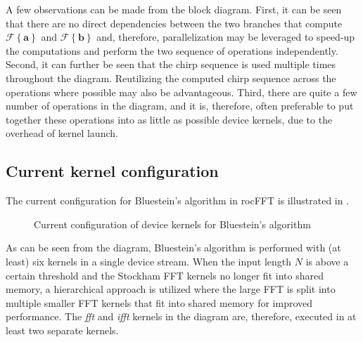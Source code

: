 \documentclass[11pt]{scrartcl}
\begin{document}
A few observations can be made from the block diagram.  First, it can be seen that there are no direct dependencies between the two branches that compute $\mathcal{F}\left\{ \mathbf{a} \right\}$ and $\mathcal{F}\left\{ \mathbf{b} \right\}$ and, therefore, parallelization may be leveraged to speed-up the computations and perform the two sequence of operations independently. Second, it can further be seen that the chirp sequence is used multiple times throughout the diagram. Reutilizing the computed chirp sequence across the operations where possible may also be advantageous. Third, there are quite a few number of operations in the diagram, and it is, therefore, often preferable to put together these operations into as little as possible device kernels, due to the overhead of kernel launch.

\subsection{Current kernel configuration}

The current configuration for Bluestein's algorithm in rocFFT is illustrated in . 

\begin{figure}[H]
\centering
{}
\caption{Current configuration of device kernels for Bluestein's algorithm}
\label{fig:kernel_configuration_current}
\end{figure}

As can be seen from the diagram, Bluestein's algorithm is performed with (at least) six kernels in a single device stream. When the input length $N$ is above a certain threshold and the Stockham FFT kernels no longer fit into shared memory, a hierarchical approach is utilized where the large FFT is split into multiple smaller FFT kernels that fit into shared memory for improved performance. The \emph{fft} and \emph{ifft} kernels in the diagram are, therefore, executed in at least two separate kernels.
\end{document}
